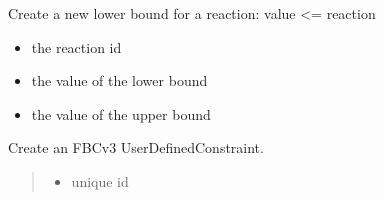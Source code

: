 \documentclass[letterpaper,12pt,english]{sphinxmanual}
\begin{document}
\begin{fulllineitems}
\begin{fulllineitems}
\begin{itemize}
\end{itemize}

\end{fulllineitems}


\begin{fulllineitems}
\label{\detokenize{api/core:cbmpy.CBModel.Model.createReactionBounds}}
\pysigstartsignatures
\pysiglinewithargsret
{}
{\sphinxparamcomma {}\sphinxparamcomma {}}
{}
\pysigstopsignatures
\sphinxAtStartPar
Create a new lower bound for a reaction: value \textless{}= reaction
\begin{itemize}
\item {} 
\sphinxAtStartPar
{} the reaction id

\item {} 
\sphinxAtStartPar
{} the value of the lower bound

\item {} 
\sphinxAtStartPar
{} the value of the upper bound

\end{itemize}

\end{fulllineitems}


\begin{fulllineitems}
\label{\detokenize{api/core:cbmpy.CBModel.Model.createUserDefinedConstraint}}
\pysigstartsignatures
\pysiglinewithargsret
{}
{\sphinxparamcomma {}\sphinxparamcomma {}\sphinxparamcomma {}}
{}
\pysigstopsignatures
\sphinxAtStartPar
Create an FBCv3 UserDefinedConstraint.
\begin{quote}\begin{description}
\begin{itemize}
\item {} 
\sphinxAtStartPar
{} \textendash{} unique id


\end{itemize}
\end{description}
\end{quote}
\end{fulllineitems}
\end{fulllineitems}
\end{document}
